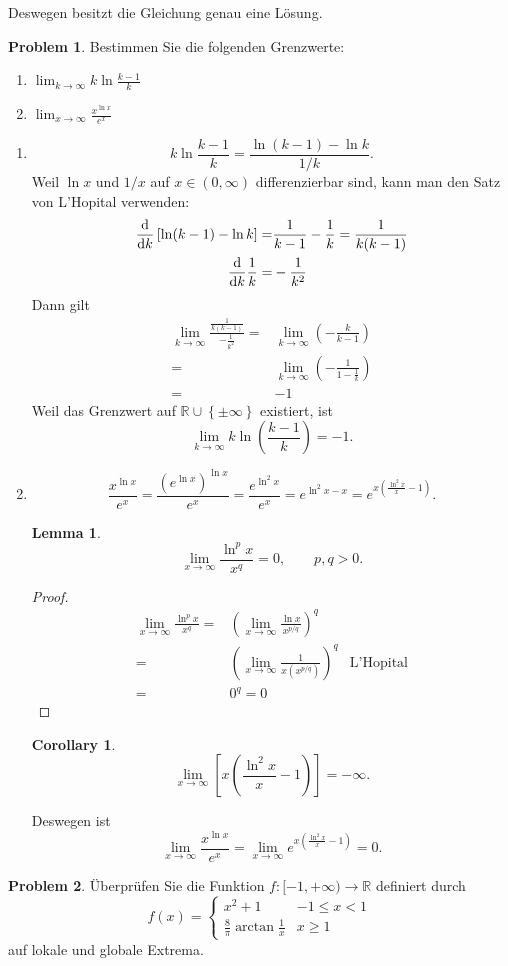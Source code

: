 \documentclass[prb,12pt]{revtex4-2}
\newtheorem{Lemma}[Theorem]{Lemma}
\newtheorem{Corollary}[Theorem]{Corollary}
\theoremstyle{definition}
\newtheorem{Problem}{Problem}
\theoremstyle{definition}
\newenvironment{parts}{\begin{enumerate}[label=(\alph*)]}{\end{enumerate}}
\newcommand{\R}{\mathbb{R}}
\begin{document}
Deswegen besitzt die Gleichung genau eine L\"{o}sung.

\begin{Problem}
	Bestimmen Sie die folgenden Grenzwerte:
	\begin{parts}
	\item $\lim_{k \to \infty} k\ln \frac{k-1}{k}$ 
	\item  $\lim_{x \to \infty} \frac{x^{\ln x}}{e^x}$
	\end{parts}
\end{Problem}

\begin{parts}
\item \[
k\ln \frac{k-1}{k}=\frac{\ln (k-1)-\ln k}{1 / k}
.\] 
Weil $\ln x$ und $1 / x$ auf $x\in (0,\infty)$ differenzierbar sind, kann man den Satz von L'Hopital verwenden:
\begin{align*}
	\dv{k}\left[ \ln(k-1)-\ln k \right] =& \frac{1}{k-1}-\frac{1}{k}=\frac{1}{k(k-1)}\\
	\dv{k}\frac{1}{k}=&-\frac{1}{k^2}
\end{align*}
Dann gilt
\begin{align*}
	\lim_{k \to \infty}  \frac{\frac{1}{k(k-1)}}{-\frac{1}{k^2}}=&\lim_{k \to \infty} \left( -\frac{k}{k-1} \right)\\
	=& \lim_{k \to \infty} \left( -\frac{1}{1-\frac{1}{k}} \right) \\
	=&-1
\end{align*}
Weil das Grenzwert auf $\R\cup \left\{ \pm\infty \right\} $ existiert, ist
\[
\lim_{k \to \infty} k\ln\left( \frac{k-1}{k} \right) =-1
.\]
\item \[
		\frac{x^{\ln x}}{e^x}=\frac{\left( e^{\ln x} \right)^{\ln x}}{e^x}=\frac{e^{\ln^2 x}}{e^x}=e^{\ln^2 x-x}=e^{x\left( \frac{\ln^2 x}{x}-1 \right) }
.\]
\begin{Lemma}
	\[
	\lim_{x \to \infty} \frac{\ln^p x}{x^q}=0,\qquad p,q>0
	.\] 
\end{Lemma}
\begin{proof}
	\begin{align*}
		\lim_{x \to \infty} \frac{\ln^p x}{x^q}=&\left( \lim_{x \to \infty} \frac{\ln x}{x^{p / q}} \right)^q\\
		=&\left( \lim_{x \to \infty} \frac{1}{x(x^{p / q})} \right)^q & \text{L'Hopital}\\
		=& 0^q=0
	\end{align*}
\end{proof}
\begin{Corollary}
	\[
	\lim_{x \to \infty} \left[ x\left( \frac{\ln^2x}{x}-1 \right)  \right] =-\infty
	.\] 
\end{Corollary}
Deswegen ist
\[
	\lim_{x \to \infty} \frac{x^{\ln x}}{e^x}=\lim_{x \to \infty} e^{x\left( \frac{\ln^2 x}{x}-1 \right) }=0
.\] 
\end{parts}
\begin{Problem}
	Überprüfen Sie die Funktion $f : [-1, +\infty) \to \R$ definiert durch
	\[
	f(x)=\begin{cases}
		x^2+1 & -1\le x < 1\\
		\frac{8}{\pi}\arctan \frac{1}{x} & x \ge 1
	\end{cases}
	\]
auf lokale und globale Extrema.
\end{Problem}
\end{document}
